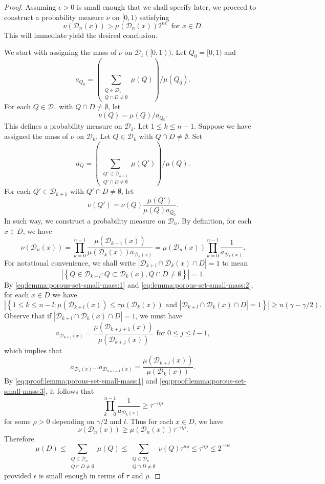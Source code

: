 \documentclass[a4paper,11pt]{amsart}
\theoremstyle{definition}
\numberwithin{equation}{section}
\def\D{\mathcal{D}}
\begin{document}
\begin{proof}
Assuming $\epsilon>0$ is small enough that we shall specify later,  we proceed to construct a probability measure $\nu$ on $[0,1)$ satisfying
\[
\nu(\D_n(x))>\mu(\D_n(x))2^{n\epsilon}  \   \textrm{ for } x\in D.
\]
This will immediate yield the desired conclusion.

We start with assigning the mass of $\nu$ on $\D_1([0,1))$.  Let $Q_0=[0,1)$ and 
\[a_{Q_0}=\left( \sum_{\substack{Q\in \D_1 \\ Q\cap D\neq \emptyset }}\mu(Q) \right)/\mu(Q_0).\]
For each $Q\in \D_1$ with $Q\cap D\neq \emptyset$, let
\[
\nu(Q)=\mu(Q)/a_{Q_0}.
\]
This defines a probability measure on $\D_1$.  
Let $1\le k\le n-1$. Suppose we have assigned the mass of $\nu$ on $\D_k$.  Let  $Q\in \D_k$ with $Q\cap D\neq \emptyset$.  Set
\[a_{Q}=\left( \sum_{\substack{Q'\in \D_{k+1} \\ Q'\cap D\neq \emptyset }}\mu(Q') \right)/\mu(Q).\]
For each $Q'\in \D_{k+1}$ with $Q'\cap D\neq \emptyset$, let
\[
\nu(Q')=\nu(Q) \frac{\mu(Q')}{\mu(Q)a_{Q_0}}.
\]
In such way,  we  construct a probability measure on  $\D_n$.  By definition, for each $x\in D$, we have
\[
\nu(\D_n(x))=\prod_{k=0}^{n-1}\frac{\mu(\D_{k+1}(x))}{\mu(\D_{k}(x))a_{\D_{k}(x)}}=\mu(\D_n(x))\prod_{k=0}^{n-1}\frac{1}{a_{\D_{k}(x)}}.
\]
{\color{black}For notational convenience,  we shall write $\left|\D_{k+l}\cap \D_k(x)\cap D \right|=1$ to mean  \[\left| \left\{Q\in \D_{k+l}:Q\subset \D_k(x),  Q\cap D\neq\emptyset  \right\} \right|=1.\] }
By \eqref{eq:lemma:porous-set-small-mass:1} and \eqref{eq:lemma:porous-set-small-mass:2}, for each $x\in D$ we have
 \begin{equation}\label{eq:proof:lemma:porous-set-small-mass:1}
\left| \left\{1\le k\le n-l: \mu(\D_{k+l}(x)) \le \tau \mu(\D_{k}(x)) \textrm{ and } \left|\D_{k+l}\cap \D_k(x)\cap D \right|=1  \right\} \right| \ge n(\gamma-\gamma/2).
\end{equation}
Observe that if {\color{black}$\left|\D_{k+l}\cap \D_k(x)\cap D \right|=1$,}  we must have 
\[
a_{\D_{k+j}(x)}=\frac{\mu(\D_{k+j+1}(x))}{\mu(\D_{k+j}(x))} \textrm{ for } 0\le j\le l-1,
\]
which implies that 
\begin{equation}\label{eq:proof:lemma:porous-set-small-mass:3}
a_{\D_{k}(x)}\ldots a_{\D_{k+l-1}(x)}=\frac{\mu(\D_{k+l}(x))}{\mu(\D_{k}(x))}. 
\end{equation}
By \eqref{eq:proof:lemma:porous-set-small-mass:1} and \eqref{eq:proof:lemma:porous-set-small-mass:3},  it follows that
\[
\prod_{k=0}^{n-1}\frac{1}{a_{\D_{k}(x)}}\ge \tau^{-n\rho}
\]
for some $\rho>0$ depending on  $\gamma/2$ and $l$.  Thus for each $x\in D$, we have
\[
\nu(\D_n(x))\ge \mu(\D_n(x))\tau^{-n\rho}.
\]
Therefore
\[
\mu(D)\le \sum_{\substack{Q\in \D_n \\ Q\cap D\neq \emptyset}}\mu(Q)\le \sum_{\substack{Q\in \D_n \\ Q\cap D\neq \emptyset}}\nu(Q) \tau^{n\rho} \le  \tau^{n\rho}\le  2^{-n\epsilon}
\]
provided $\epsilon$ is small enough in terms of $\tau$ and $\rho$.
\end{proof}
\end{document}
